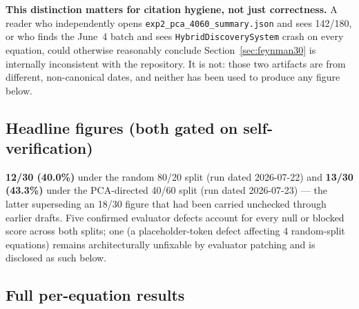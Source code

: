 \documentclass[11pt]{article}
\begin{document}
\textbf{This distinction matters for citation hygiene, not just
correctness.} A reader who independently opens
\texttt{exp2\_pca\_4060\_summary.json} and sees 142/180, or who finds the
June~4 batch and sees \texttt{HybridDiscoverySystem} crash on every
equation, could otherwise reasonably conclude Section~\ref{sec:feynman30}
is internally inconsistent with the repository. It is not: those two
artifacts are from different, non-canonical dates, and neither has been
used to produce any figure below.

\subsection*{Headline figures (both gated on self-verification)}

\textbf{12/30 (40.0\%)} under the random 80/20 split (run dated
2026-07-22) and \textbf{13/30 (43.3\%)} under the PCA-directed 40/60
split (run dated 2026-07-23) --- the latter superseding an 18/30 figure
that had been carried unchecked through earlier drafts. Five confirmed
evaluator defects account for every null or blocked score across both
splits; one (a placeholder-token defect affecting 4 random-split
equations) remains architecturally unfixable by evaluator patching and is
disclosed as such below.

\subsection*{Full per-equation results}
\end{document}
